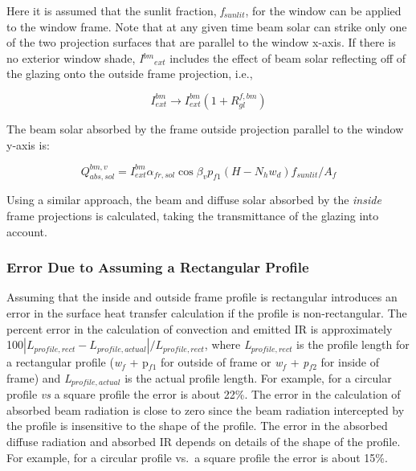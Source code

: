 Here it is assumed that the sunlit fraction, \emph{f\(_{sunlit}\)}, for the window can be applied to the window frame. Note that at any given time beam solar can strike only one of the two projection surfaces that are parallel to the window x-axis. If there is no exterior window shade, \emph{I\(^{bm}\)\(_{ext}\)} includes the effect of beam solar reflecting off of the glazing onto the outside frame projection, i.e.,

\begin{equation}
I_{ext}^{bm} \to I_{ext}^{bm}\left( {1 + R_{gl}^{f,bm}} \right)
\end{equation}

The beam solar absorbed by the frame outside projection parallel to the window y-axis is:

\begin{equation}
Q_{abs,sol}^{bm,v} = I_{ext}^{bm}{\alpha_{fr,sol}}\cos {\beta_v}{p_{f1}}\left( {H - {N_h}{w_d}} \right){f_{sunlit}}/{A_f}
\end{equation}

Using a similar approach, the beam and diffuse solar absorbed by the \emph{inside} frame projections is calculated, taking the transmittance of the glazing into account.

\subsubsection{Error Due to Assuming a Rectangular Profile}\label{error-due-to-assuming-a-rectangular-profile}

Assuming that the inside and outside frame profile is rectangular introduces an error in the surface heat transfer calculation if the profile is non-rectangular. The percent error in the calculation of convection and emitted IR is approximately 100\(\left| {{L_{profile,rect}} - {L_{profile,actual}}} \right|/{L_{profile,rect}}\), where \emph{L\(_{profile,rect}\)} is the profile length for a rectangular profile (\emph{w\(_{f}\)} + p\(_{f1}\) for outside of frame or \emph{w\(_{f}\)} + \emph{p\(_{f2}\)} for inside of frame) and \emph{L\(_{profile,actual}\)} is the actual profile length. For example, for a circular profile \emph{vs} a square profile the error is about 22\%. The error in the calculation of absorbed beam radiation is close to zero since the beam radiation intercepted by the profile is insensitive to the shape of the profile. The error in the absorbed diffuse radiation and absorbed IR depends on details of the shape of the profile. For example, for a circular profile vs.~a square profile the error is about 15\%.

